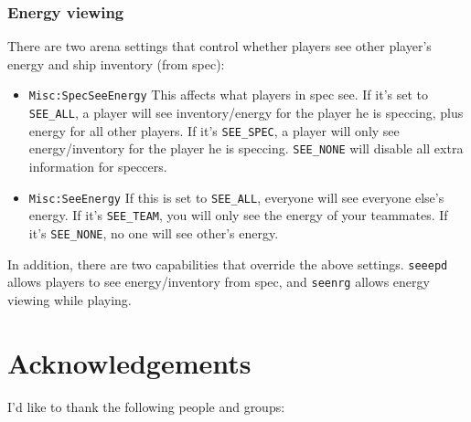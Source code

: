 \documentclass{article}
\begin{document}
\subsubsection{Energy viewing}

There are two arena settings that control whether players see other
player's energy and ship inventory (from spec):

\begin{itemize}

\item{\texttt{Misc:SpecSeeEnergy}} This affects what players in spec
see. If it's set to \verb/SEE_ALL/, a player will see inventory/energy
for the player he is speccing, plus energy for all other players. If
it's \verb/SEE_SPEC/, a player will only see energy/inventory for the
player he is speccing.  \verb/SEE_NONE/ will disable all extra
information for speccers.

\item{\texttt{Misc:SeeEnergy}} If this is set to \verb/SEE_ALL/,
everyone will see everyone else's energy.  If it's \verb/SEE_TEAM/, you
will only see the energy of your teammates. If it's \verb/SEE_NONE/, no
one will see other's energy.

\end{itemize}

In addition, there are two capabilities that override the above
settings. \verb/seeepd/ allows players to see energy/inventory from
spec, and \verb/seenrg/ allows energy viewing while playing.


\section{Acknowledgements}

I'd like to thank the following people and groups:
\end{document}
